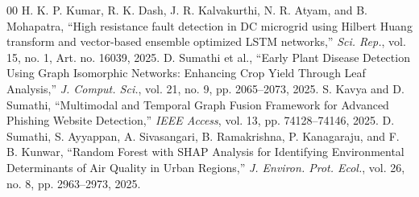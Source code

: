 \documentclass[conference]{IEEEtran}
\begin{document}
{\begin{thebibliography}{00}
 H. K. P. Kumar, R. K. Dash, J. R. Kalvakurthi, N. R. Atyam, and B. Mohapatra, ``High resistance fault detection in DC microgrid using Hilbert Huang transform and vector-based ensemble optimized LSTM networks,'' \textit{Sci. Rep.}, vol. 15, no. 1, Art. no. 16039, 2025.
 D. Sumathi et al., ``Early Plant Disease Detection Using Graph Isomorphic Networks: Enhancing Crop Yield Through Leaf Analysis,'' \textit{J. Comput. Sci.}, vol. 21, no. 9, pp. 2065--2073, 2025.
 S. Kavya and D. Sumathi, ``Multimodal and Temporal Graph Fusion Framework for Advanced Phishing Website Detection,'' \textit{IEEE Access}, vol. 13, pp. 74128--74146, 2025.
 D. Sumathi, S. Ayyappan, A. Sivasangari, B. Ramakrishna, P. Kanagaraju, and F. B. Kunwar, ``Random Forest with SHAP Analysis for Identifying Environmental Determinants of Air Quality in Urban Regions,'' \textit{J. Environ. Prot. Ecol.}, vol. 26, no. 8, pp. 2963--2973, 2025.
\end{thebibliography}
}
\end{document}
